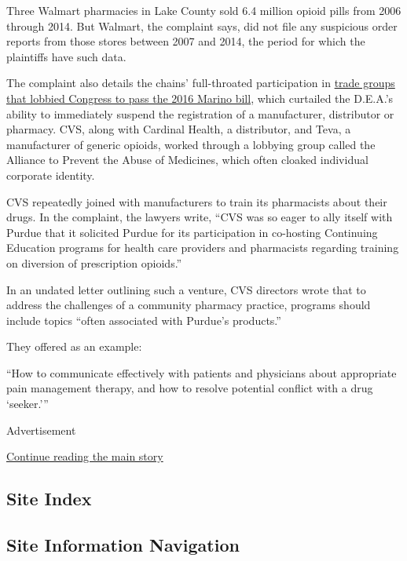Three Walmart pharmacies in Lake County sold 6.4 million opioid pills
from 2006 through 2014. But Walmart, the complaint says, did not file
any suspicious order reports from those stores between 2007 and 2014,
the period for which the plaintiffs have such data.

The complaint also details the chains' full-throated participation in
\href{https://www.washingtonpost.com/graphics/2017/investigations/dea-drug-industry-congress/}{trade
groups that lobbied Congress to pass the 2016 Marino bill}, which
curtailed the D.E.A.'s ability to immediately suspend the registration
of a manufacturer, distributor or pharmacy. CVS, along with Cardinal
Health, a distributor, and Teva, a manufacturer of generic opioids,
worked through a lobbying group called the Alliance to Prevent the Abuse
of Medicines, which often cloaked individual corporate identity.

CVS repeatedly joined with manufacturers to train its pharmacists about
their drugs. In the complaint, the lawyers write, ``CVS was so eager to
ally itself with Purdue that it solicited Purdue for its participation
in co-hosting Continuing Education programs for health care providers
and pharmacists regarding training on diversion of prescription
opioids.''

In an undated letter outlining such a venture, CVS directors wrote that
to address the challenges of a community pharmacy practice, programs
should include topics ``often associated with Purdue's products.''

They offered as an example:

``How to communicate effectively with patients and physicians about
appropriate pain management therapy, and how to resolve potential
conflict with a drug `seeker.'''

Advertisement

\protect\hyperlink{after-bottom}{Continue reading the main story}

\hypertarget{site-index}{%
\subsection{Site Index}\label{site-index}}

\hypertarget{site-information-navigation}{%
\subsection{Site Information
Navigation}\label{site-information-navigation}}

